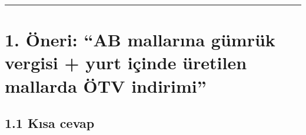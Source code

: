 \begin{center}\rule{0.5\linewidth}{0.5pt}\end{center}

\hypertarget{02a_politika_uzayi-1-uxf6neri-ab-mallarux131na-guxfcmruxfck-vergisi--yurt-iuxe7inde-uxfcretilen-mallarda-uxf6tv-indirimi}{%
\section{1. Öneri: ``AB mallarına gümrük vergisi + yurt içinde üretilen mallarda ÖTV indirimi''}\label{02a_politika_uzayi-1-uxf6neri-ab-mallarux131na-guxfcmruxfck-vergisi--yurt-iuxe7inde-uxfcretilen-mallarda-uxf6tv-indirimi}}

\hypertarget{02a_politika_uzayi-11-kux131sa-cevap}{%
\subsection{1.1 Kısa cevap}\label{02a_politika_uzayi-11-kux131sa-cevap}}

